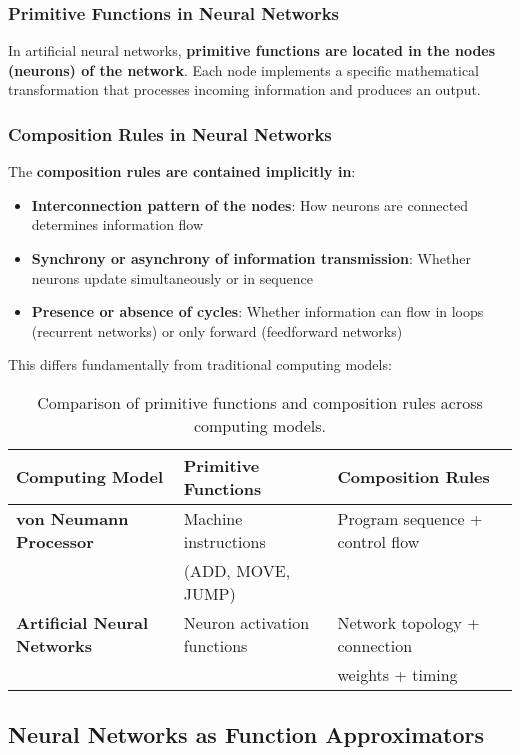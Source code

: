 \subsubsection{Primitive Functions in Neural Networks}
In artificial neural networks, \textbf{primitive functions are located in the nodes (neurons) of the network}. Each node implements a specific mathematical transformation that processes incoming information and produces an output.

\subsubsection{Composition Rules in Neural Networks}
The \textbf{composition rules are contained implicitly in}:
\begin{itemize}
    \item \textbf{Interconnection pattern of the nodes}: How neurons are connected determines information flow
    \item \textbf{Synchrony or asynchrony of information transmission}: Whether neurons update simultaneously or in sequence
    \item \textbf{Presence or absence of cycles}: Whether information can flow in loops (recurrent networks) or only forward (feedforward networks)
\end{itemize}

This differs fundamentally from traditional computing models:

\begin{table}[h!]
\centering
\begin{tabular}{|l|l|l|}
\hline
\textbf{Computing Model} & \textbf{Primitive Functions} & \textbf{Composition Rules} \\
\hline
\textbf{von Neumann Processor} & Machine instructions & Program sequence + control flow \\
& (ADD, MOVE, JUMP) & \\
\hline
\textbf{Artificial Neural Networks} & Neuron activation functions & Network topology + connection \\
& & weights + timing \\
\hline
\end{tabular}
\caption{Comparison of primitive functions and composition rules across computing models.}
\end{table}

\subsection{Neural Networks as Function Approximators}

